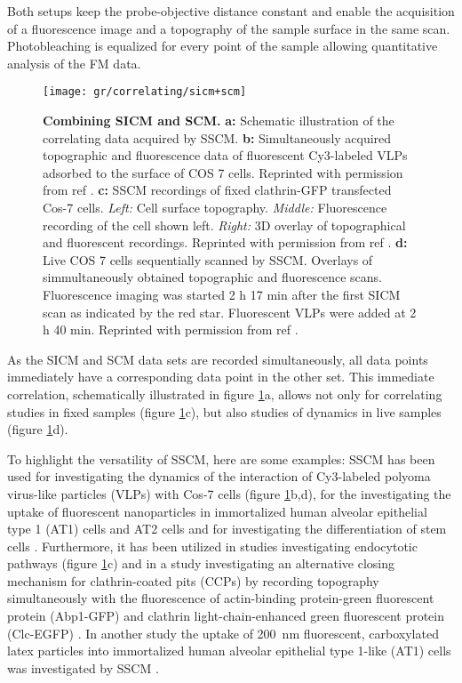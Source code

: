 Both setups keep the probe-objective distance constant and enable the acquisition of a fluorescence
image and a topography of the sample surface in the same scan. Photobleaching is equalized for every
point of the sample allowing quantitative analysis of the FM data.

\begin{figure}
  \texttt{[image: gr/correlating/sicm+scm]}
  \caption{%
    \textbf{Combining SICM and SCM.}
    \textbf{a:} Schematic illustration of the correlating data acquired by SSCM.
    \textbf{b:} Simultaneously acquired topographic and fluorescence data of fluorescent Cy3-labeled 
    VLPs adsorbed to the surface of COS 7 cells. Reprinted with permission from ref \cite{Gorelik2002}.
    \textbf{c:} SSCM recordings of fixed clathrin-GFP transfected Cos-7 cells. 
    	\textit{Left:} Cell surface topography. 
    	\textit{Middle:} Fluorescence recording of the cell shown left. 
    	\textit{Right:} 3D overlay of topographical and fluorescent recordings. 
    Reprinted with permission from ref \cite{Shevchuk2008}.
    \textbf{d:} Live COS 7 cells sequentially scanned by SSCM. Overlays of simmultaneously obtained 
    topographic and fluorescence scans. Fluorescence imaging was started 2 h 17 min after the first 
    SICM scan as indicated by the red star. Fluorescent VLPs were added at 2 h 40 min. 
    Reprinted with permission from ref \cite{Gorelik2002}.
  }
  \label{fig:sicm+scm}
\end{figure}

As the SICM and SCM data sets are recorded simultaneously, all data points immediately have a
corresponding data point in the other set. This immediate correlation, schematically illustrated in
figure \ref{fig:sicm+scm}a, allows not only for correlating studies in fixed samples (figure 
\ref{fig:sicm+scm}c), but also studies of dynamics in live samples (figure \ref{fig:sicm+scm}d).

To highlight the versatility of SSCM, here are some examples: SSCM has been used for investigating the
dynamics of the interaction of Cy3-labeled polyoma virus-like particles (VLPs) with Cos-7 cells 
(figure \ref{fig:sicm+scm}b,d), for the investigating the uptake of fluorescent nanoparticles in 
immortalized human alveolar epithelial type 1 (AT1) cells and AT2 cells \cite{Kemp2008} and for 
investigating the differentiation of stem cells \cite{Gorelik2008}. Furthermore, it has been utilized
in studies investigating endocytotic pathways \cite{Shevchuk2008} (figure \ref{fig:sicm+scm}c) and in
a study investigating an alternative closing mechanism for clathrin-coated pits (CCPs) by recording 
topography simultaneously with the fluorescence of actin-binding protein-green fluorescent protein 
(Abp1-GFP) and clathrin light-chain-enhanced green fluorescent protein (Clc-EGFP) \cite{Shevchuk2012}.
In another study the uptake of 200~nm fluorescent, carboxylated latex particles into immortalized human
alveolar epithelial type 1-like (AT1) cells was investigated by SSCM \cite{Novak2014}. 


